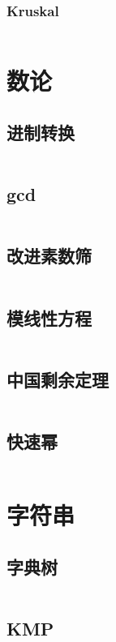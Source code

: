 \documentclass[a4paper,11pt]{article}
\begin{document}
\subsubsection{Kruskal} 
\inputminted[breaklines]{c++}{graph/kruskal.cpp}



\section{数论}
\subsection{进制转换}
\inputminted[breaklines]{c++}{number_theory/base_conversion.cpp}
\subsection{gcd}
\inputminted[breaklines]{c++}{number_theory/gcd.cpp}
\subsection{改进素数筛}
\inputminted[breaklines]{c++}{number_theory/prime.cpp}
\subsection{模线性方程}
\inputminted[breaklines]{c++}{number_theory/modequ.cpp}

\subsection{中国剩余定理}
\inputminted[breaklines]{c++}{number_theory/china.cpp}
\subsection{快速幂}
\inputminted[breaklines]{c++}{number_theory/pow_mod.cpp}





\section{字符串}
\subsection{字典树}
\inputminted[breaklines]{c++}{string/trie.cpp}
\subsection{KMP}
\inputminted[breaklines]{c++}{string/kmp.cpp}
\end{document}
